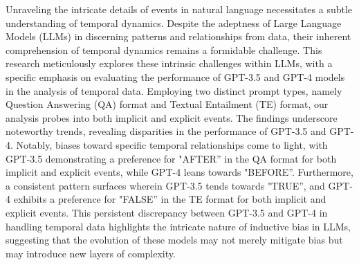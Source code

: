 Unraveling the intricate details of events in natural language necessitates a subtle understanding of temporal dynamics. Despite the adeptness of Large Language Models (LLMs) in discerning patterns and relationships from data, their inherent comprehension of temporal dynamics remains a formidable challenge. This research meticulously explores these intrinsic challenges within LLMs, with a specific emphasis on evaluating the performance of GPT-3.5 and GPT-4 models in the analysis of temporal data. Employing two distinct prompt types, namely Question Answering (QA) format and Textual Entailment (TE) format, our analysis probes into both implicit and explicit events. The findings underscore noteworthy trends, revealing disparities in the performance of GPT-3.5 and GPT-4. Notably, biases toward specific temporal relationships come to light, with GPT-3.5 demonstrating a preference for "AFTER'' in the QA format for both implicit and explicit events, while GPT-4 leans towards "BEFORE''. Furthermore, a consistent pattern surfaces wherein GPT-3.5 tends towards "TRUE'', and GPT-4 exhibits a preference for "FALSE'' in the TE format for both implicit and explicit events. This persistent discrepancy between GPT-3.5 and GPT-4 in handling temporal data highlights the intricate nature of inductive bias in LLMs, suggesting that the evolution of these models may not merely mitigate bias but may introduce new layers of complexity.